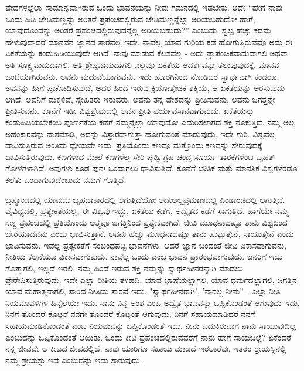 ವೇದಗಳಲ್ಲೆಲ್ಲಾ ಸಾಮಾನ್ಯವಾಗಿರುವ ಒಂದು ಭಾವನೆಯನ್ನು ನೀವು ಗಮನದಲ್ಲಿ ಇಡಬೇಕು. ಅದೇ “ಹೇಗೆ ನಾವು ಒಂದು ಹಿಡಿ ಜೇಡಿಮಣ್ಣನ್ನು ಅರಿತರೆ ಪ್ರಪಂಚದಲ್ಲಿರುವ ಜೇಡಿಮಣ್ಣನ್ನೆಲ್ಲಾ ಅರಿಯಬಹುದೋ ಹಾಗೆ, ಯಾವುದೊಂದನ್ನು ಅರಿತರೆ ಪ್ರಪಂಚದಲ್ಲಿರುವುದನ್ನೆಲ್ಲ ಅರಿಯಬಹುದು?” ಎಂಬುದು. ಸ್ವಲ್ಪ ಹೆಚ್ಚು ಕಡಮೆ ಹೇಳುವುದಾದರೆ ಮಾನವನ ಜ್ಞಾನದ ಸಾರವೆಲ್ಲ ಇದೇ. ನಾವೆಲ್ಲ ಯಾವ ಗುರಿಯ ಕಡೆ ಹೋಗುತ್ತಿರುವೆವೊ ಅದು ಈ ಏಕತೆಯನ್ನು ಕಂಡುಹಿಡಿಯುವುದೇ ಆಗಿದೆ. ನಾವು ಮಾಡುವ ಕೆಲಸವೆಲ್ಲ - ಅದು ಪ್ರಾಪಂಚಿಕವಾದುದಾಗಲಿ ಅಥವಾ ಅತಿ ಸೂಕ್ಷ್ಮವಾದುದಾಗಲಿ, ಅತಿ ಶ್ರೇಷ್ಠವಾದುದಾಗಲಿ ಎಲ್ಲವೂ ಏಕತೆಯ ಆದರ್ಶವನ್ನು ತಲುಪುವುದಕ್ಕೆ. ಮಾನವ ಒಂಟಿಯಾಗಿರುವನು. ಅವನು ಮದುವೆಯಾಗುವನು. ಇದು ಹೊರಗಿನಿಂದ ನೋಡಿದರೆ ಸ್ವಾರ್ಥವಾಗಿ ಕಂಡರೂ, ಅವನನ್ನು ಹೀಗೆ ಪ್ರಚೋದಿಸುವುದೆ, ಅದರ ಹಿಂದೆ ಇರುವ ಕ್ರಿಯೋತ್ತೇಜಕ ಶಕ್ತಿಯೆ, ಆ ಏಕತೆಯನ್ನು ಅರಸುವುದು ಆಗಿದೆ. ಅವನಿಗೆ ಮಕ್ಕಳಿವೆ, ಸ್ನೇಹಿತರು ಇರುವರು, ಅವನು ತನ್ನ ದೇಶವನ್ನು ಪ್ರೀತಿಸುವನು, ಅವನು ಜಗತ್ತನ್ನೇ ಪ್ರೀತಿಸುವನು. ಕೊನೆಗೆ ಇಡೀ ವಿಶ್ವಪ್ರೇಮದಲ್ಲಿ ಅವನ ಪ್ರೀತಿ ಪರ್ಯವಸಾನವಾಗುವುದು. ಏಕತೆಯನ್ನು ಕಂಡುಹಿಡಿಯಬೇಕೆಂಬ ಪೂರ್ಣತೆಯ ಕಡೆಗೆ ನಮ್ಮನ್ನೆಲ್ಲಾ ಯಾವುದೋ ಎದುರಿಸಲಾಗದ ಶಕ್ತಿ ನೂಕುತ್ತಿದೆ. ನಮ್ಮ ಅಲ್ಪ ಅಹಂಕಾರವನ್ನು ನಾಶಮಾಡಿ, ಅದನ್ನು ವಿಸ್ತಾರವಾಗುತ್ತಾ ಹೋಗುವಂತೆ ಮಾಡುವುದು. ಇದೇ ಗುರಿ. ವಿಶ್ವವೆಲ್ಲ ಧಾವಿಸುತ್ತಿರುವ ಅಂತಿಮ ಧ್ಯೇಯವೇ ಇದು. ಪ್ರತಿಯೊಂದು ಕಣವೂ ಮತ್ತೊಂದು ಕಣವನ್ನು ಸೇರುವುದಕ್ಕೆ ಧಾವಿಸುತ್ತಿರುವುದು. ಕಣಗಳಾದ ಮೇಲೆ ಕಣಗಳೆಲ್ಲ ಸೇರಿ ಪೃಥ್ವಿ ಗ್ರಹ ಚಂದ್ರ ಸೂರ್ಯ ತಾರಕೆಗಳೆಂಬ ಬೃಹತ್ ಗೋಳಗಳಾಗಿವೆ. ಅವುಗಳು ಕೂಡ ಪುನಃ ಒಂದಾಗಲು ಧಾವಿಸುತ್ತಿವೆ. ಕೊನೆಗೆ ಭೌತಿಕ ಮತ್ತು ಮಾನಸಿಕ ವಿಶ್ವಗಳೆರಡೂ ಕಲೆತು ಒಂದಾಗುವುದೆಂಬುದು ನಮಗೆ ಗೊತ್ತಿದೆ.

ಬ್ರಹ್ಮಾಂಡದಲ್ಲಿ ಯಾವುದು ಬೃಹದಾಕಾರದಲ್ಲಿ ಆಗುತ್ತಿದೆಯೋ ಅದೇ\break ಅಲ್ಪಪ್ರಮಾಣದಲ್ಲಿ ಪಿಂಡಾಂಡದಲ್ಲಿ ಆಗುತ್ತಿದೆ. ವೈವಿಧ್ಯದಲ್ಲಿ, ಪ್ರತ್ಯೇಕತೆಯಲ್ಲಿ, ಈ ವಿಶ್ವವು ಇದ್ದು, ಏಕತೆಯ ಕಡೆಗೆ, ಅದ್ವೈತದ ಕಡೆಗೆ ಸಾಗುತ್ತಿದೆ. ಹಾಗೆಯೇ ನಮ್ಮ ಸಣ್ಣ ಪ್ರಪಂಚದಲ್ಲಿ ಪ್ರತಿಯೊಂದು ಆತ್ಮವೂ ಜಗತ್ತಿನಿಂದ ಪ್ರತ್ಯೇಕವಾಗಿದೆ. ಜೀವಿ ಮೂಢನಾದಷ್ಟೂ ತಾನು ವಿಶ್ವದಿಂದ ಬೇರೆಯಾದವನು ಎಂದು ಭಾವಿಸುತ್ತಾನೆ. ಅವನು ಹೆಚ್ಚು ಮೂಢನಾದಷ್ಟೂ ತಾನು ಹುಟ್ಟುತ್ತೇನೆ, ಸಾಯುತ್ತೇನೆ ಎಂದು ಭಾವಿಸುವನು. ಇವೆಲ್ಲ ಪ್ರತ್ಯೇಕತೆಗೆ ಸಂಬಂಧಪಟ್ಟ ಭಾವನೆಗಳು. ಆದರೆ ಜ್ಞಾನ ಬಂದಂತೆ ಜೀವಿ ವಿಕಾಸವಾಗುವನು, ನೀತಿಯ ಕಲ್ಪನೆಯೂ ವಿಕಾಸವಾಗುವುದು. ನಾವೆಲ್ಲ ಒಂದು ಎಂಬ ಭಾವನೆ ಪ್ರಾರಂಭವಾಗುವುದು. ಜನರಿಗೆ ಇದು ಗೊತ್ತಾಗಲಿ, ಇಲ್ಲದೆ ಇರಲಿ, ನಮ್ಮ ಹಿಂದೆ ಇರುವ ಶಕ್ತಿ ನಮ್ಮನ್ನು ಸ್ವಾರ್ಥಹೀನರನ್ನಾಗಿ ಮಾಡಲು ಪ್ರೇರೇಪಿಸುತ್ತಿರುವುದು. ಇದೇ ಎಲ್ಲಾ ರೀತಿಯ ತಳಹದಿ. ಯಾವ ಭಾಷೆಯಲ್ಲಾಗಲಿ, ಯಾವ ಧರ್ಮದಲ್ಲಾಗಲಿ, ಜಗತ್ತಿನ ಯಾವ ಮಹಾತ್ಮನಾಗಲಿ, ಸಾರಿದ ನೀತಿಯ ಸಾರವೆ ಇದು. "ಸ್ವಾರ್ಥಹೀನರಾಗಿ', 'ನಾನಲ್ಲ ನೀನು'' - ಎಲ್ಲಾ ನೀತಿ ನಿಯಮಾವಳಿಗಳ ಹಿನ್ನೆಲೆಯೇ ಇದು. ನಾನು ನಿನ್ನ ಅಂಶ ಎಂಬ ಅದ್ವೈತ ಭಾವವನ್ನು ಒಪ್ಪಿಕೊಂಡಂತೆ ಆಗುವುದು ಇದು. ನಿನಗೆ ತೊಂದರೆ ಕೊಟ್ಟರೆ ನನಗೇ ತೊಂದರೆ ಕೊಟ್ಟಂತೆ ಆಗುವುದು; ನಿನಗೆ ಸಹಾಯಮಾಡಿದರೆ ನನಗೆ ಸಹಾಯಮಾಡಿಕೊಂಡಂತೆ ಎಂಬ ನಿಯಮವನ್ನು ಒಪ್ಪಿಕೊಂಡಂತೆ ಇದು. ನೀನು ಬದುಕಿರುವಾಗ ನಾನು ಸಾಯುವುದಿಲ್ಲ ಎಂಬುದನ್ನು ಒಪ್ಪಿಕೊಂಡಂತೆ ಆಯಿತು. ಒಂದು ಕೀಟ ಪ್ರಪಂಚದಲ್ಲಿರುವವರೆಗೆ ನಾನು ಹೇಗೆ ಸಾಯಬಲ್ಲೆ? ಏಕೆಂದರೆ ನನ್ನ ಜೀವವೇ ಆ ಕೀಟದ ಜೀವದಲ್ಲಿದೆ. ನಾವು ಯಾರಿಗೂ ಸಹಾಯ ಮಾಡದೆ ಇರಲಾರೆವು, ಇತರರ ಶ್ರೇಯಸ್ಸಿನಲ್ಲಿ ನಮ್ಮ ಶ್ರೇಯಸ್ಸು ಇದೆ ಎಂಬುದನ್ನು ಇದು ಸಾರುವುದು.

